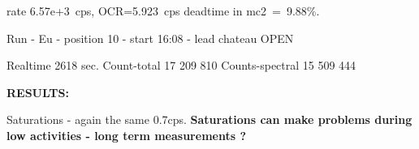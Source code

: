 \documentclass[12pt]{article}
\begin{document}
 rate 6.57e+3~cps,  OCR=5.923~cps  deadtime in mc2~=~9.88\%.

Run - Eu - position 10 - start 16:08 - lead chateau OPEN

Realtime 2618 sec.  Count-total 17 209 810    Counts-spectral 15 509 444


{\bf RESULTS: }
\begin{table}[!ht]
\end{table}


Saturations - again the same  0.7cps. {\bf Saturations can make problems
  during low activities - long term measurements ? }
\end{document}
